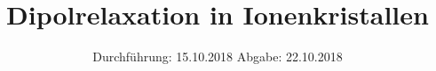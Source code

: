 

\subject{48}
\title{Dipolrelaxation in Ionenkristallen}
\date{
  Durchführung: 15.10.2018
  \hspace{3em}
  Abgabe: 22.10.2018
}



\maketitle
\thispagestyle{empty}
\tableofcontents
\newpage
\setcounter{page}{1}





\printbibliography



